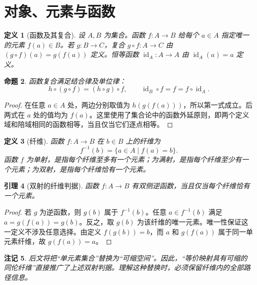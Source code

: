 \documentclass[12pt,oneside,openany,fontset=none]{ctexbook}
\theoremstyle{cn}
\newtheorem{definition}{定义}[chapter]
\newtheorem{lemma}[definition]{引理}
\newtheorem{proposition}[definition]{命题}
\newtheorem{remark}[definition]{注记}
\numberwithin{equation}{chapter}
\newcommand{\id}{\operatorname{id}}
\begin{document}
\section{对象、元素与函数}
\begin{definition}[函数及其复合]
设 $A,B$ 为集合。函数 $f:A\to B$ 给每个 $a\in A$ 指定唯一的元素 $f(a)\in B$。若 $g:B\to C$，复合 $g\circ f:A\to C$ 由 $(g\circ f)(a)=g(f(a))$ 定义。恒等函数 $\id_A:A\to A$ 由 $\id_A(a)=a$ 定义。
\end{definition}
\begin{proposition}
函数复合满足结合律及单位律：
\[
h\circ(g\circ f)=(h\circ g)\circ f,
\qquad \id_B\circ f=f=f\circ\id_A.
\]
\end{proposition}
\begin{proof}
在任意 $a\in A$ 处，两边分别取值为 $h(g(f(a)))$，所以第一式成立。后两式在 $a$ 处的值均为 $f(a)$。这里使用了集合论中的函数外延原则，即两个定义域和陪域相同的函数相等，当且仅当它们逐点相等。
\end{proof}
\begin{definition}[纤维]
函数 $f:A\to B$ 在 $b\in B$ 上的纤维为
\[
f^{-1}(b)=\{a\in A\mid f(a)=b\}.
\]
函数 $f$ 为单射，是指每个纤维至多有一个元素；为满射，是指每个纤维至少有一个元素；为双射，是指每个纤维恰有一个元素。
\end{definition}
\begin{lemma}[双射的纤维判据]
函数 $f:A\to B$ 有双侧逆函数，当且仅当每个纤维恰有一个元素。
\end{lemma}
\begin{proof}
若 $g$ 为逆函数，则 $g(b)$ 属于 $f^{-1}(b)$。任意 $a\in f^{-1}(b)$ 满足 $a=g(f(a))=g(b)$。反之，取 $g(b)$ 为该纤维的唯一元素。唯一性保证这一定义不涉及任意选择。由定义 $f(g(b))=b$，而 $a$ 和 $g(f(a))$ 属于同一单元素纤维，故 $g(f(a))=a$。
\end{proof}
\begin{remark}
后文将把“单元素集合”替换为“可缩空间”。因此，“等价映射具有可缩的同伦纤维”直接推广了上述双射判据。理解这种替换时，必须保留纤维内的全部路径信息。
\end{remark}
\end{document}
